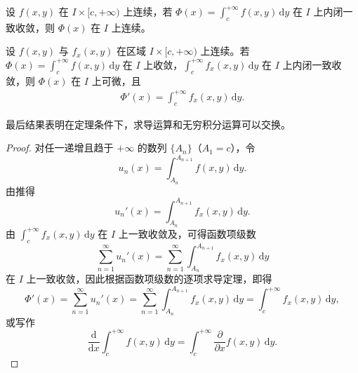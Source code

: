 \documentclass[../../main.tex]{subfiles}%
\begin{document}
\begin{corollary}
设 \( f(x,y) \) 在 \( I \times [c, +\infty) \) 上连续，若 \( \Phi(x) = \int_{c}^{+\infty} f(x,y) \, \mathrm{d}y \) 在 \( I \) 上内闭一致收敛，则 \( \Phi(x) \) 在 \( I \) 上连续。
\end{corollary}

\begin{theorem}[含参反常积分的可微性]\label{theorem:含参反常积分的可微性}
设 \( f(x,y) \) 与 \( f_x(x,y) \) 在区域 \( I \times [c, +\infty) \) 上连续。若 \( \Phi(x) = \int_{c}^{+\infty} f(x,y) \, \mathrm{d}y \) 在 \( I \) 上收敛，\( \int_{c}^{+\infty} f_x(x,y) \, \mathrm{d}y \) 在 \( I \) 上内闭一致收敛，则 \( \Phi(x) \) 在 \( I \) 上可微，且
\begin{align}\label{eq::::--34802jrw4f345634t}
\Phi'(x) = \int_{c}^{+\infty} f_x(x,y) \, \mathrm{d}y.
\end{align}
\end{theorem}
\begin{note}
最后结果表明在定理条件下，求导运算和无穷积分运算可以交换。
\end{note}
\begin{proof}
对任一递增且趋于 \( +\infty \) 的数列 \( \{A_n\} \)（\( A_1 = c \)），令
\[
u_n(x) = \int_{A_n}^{A_{n+1}} f(x,y) \, \mathrm{d}y.
\]
由推得
\[
u_n'(x) = \int_{A_n}^{A_{n+1}} f_x(x,y) \, \mathrm{d}y.
\]
由 \( \int_{c}^{+\infty} f_x(x,y) \, \mathrm{d}y \) 在 \( I \) 上一致收敛及，可得函数项级数
\[
\sum_{n=1}^{\infty} u_n'(x) = \sum_{n=1}^{\infty} \int_{A_n}^{A_{n+1}} f_x(x,y) \, \mathrm{d}y
\]
在 \( I \) 上一致收敛，因此根据函数项级数的逐项求导定理，即得
\[
\Phi'(x) = \sum_{n=1}^{\infty} u_n'(x) = \sum_{n=1}^{\infty} \int_{A_n}^{A_{n+1}} f_x(x,y) \, \mathrm{d}y = \int_{c}^{+\infty} f_x(x,y) \, \mathrm{d}y,
\]
或写作
\[
\frac{\mathrm{d}}{\mathrm{d}x} \int_{c}^{+\infty} f(x,y) \, \mathrm{d}y = \int_{c}^{+\infty} \frac{\partial}{\partial x} f(x,y) \, \mathrm{d}y.
\]
\end{proof}
\end{document}
